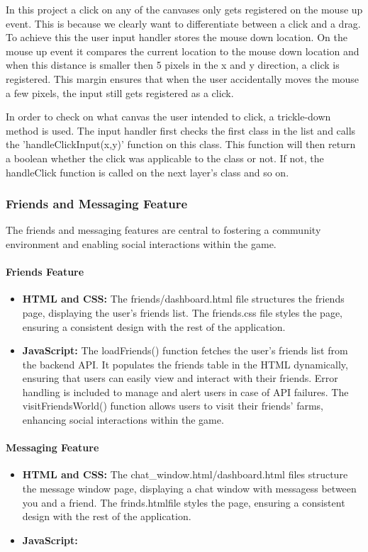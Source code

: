 \documentclass[12pt]{article}
\begin{document}
In this project a click on any of the canvases only gets registered on the mouse up event. This is because we clearly
want to differentiate between a click and a drag. To achieve this the user input handler stores the mouse down location.
On the mouse up event it compares the current location to the mouse down location and when this distance is smaller then
5 pixels in the x and y direction, a click is registered. This margin ensures that when the user accidentally moves the
mouse a few pixels, the input still gets registered as a click.

In order to check on what canvas the user intended to click, a trickle-down method is used. The input handler first
checks the first class in the list and calls the 'handleClickInput(x,y)' function on this class. This function will then
return a boolean whether the click was applicable to the class or not. If not, the handleClick function is called on the
next layer's class and so on.


\subsubsection{Friends and Messaging Feature}
The friends and messaging features are central to fostering a community environment and enabling social interactions within the game.
\paragraph{Friends Feature}
\begin{itemize}
    \item \textbf{HTML and CSS:} The friends/dashboard.html file structures the friends page, displaying the user's friends list. The friends.css file styles the page, ensuring a consistent design with the rest of the application.
    \item \textbf{JavaScript:} The loadFriends() function fetches the user's friends list from the backend API. It populates the friends table in the HTML dynamically, ensuring that users can easily view and interact with their friends. Error handling is included to manage and alert users in case of API failures. The visitFriendsWorld() function allows users to visit their friends' farms, enhancing social interactions within the game.
\end{itemize}

\paragraph{Messaging Feature}
\begin{itemize}
    \item \textbf{HTML and CSS:} The chat_window.html/dashboard.html files structure the message window page, displaying a chat window with messagess between you and a friend. The frinds.htmlfile styles the page, ensuring a consistent design with the rest of the application.
    \item \textbf{JavaScript:}
\end{itemize}
\end{document}
